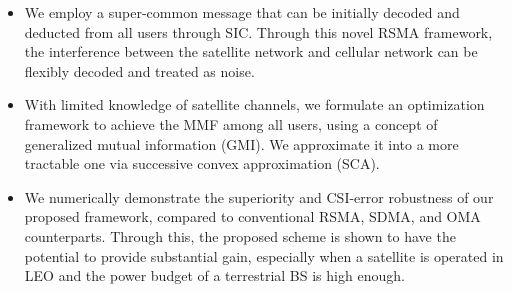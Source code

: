 \documentclass[draftclsnofoot, onecolumn, comsoc, 12pt]{IEEEtran}
\begin{document}
\begin{itemize}
\item We employ a super-common message that can be initially decoded and deducted from all users through SIC.
Through this novel RSMA framework, the interference between the satellite network and cellular network can be flexibly decoded and  treated as noise.%
\item {With limited knowledge of satellite channels, we formulate an optimization framework to achieve the MMF among all users, using a concept of generalized mutual information (GMI). 
We approximate it into a more tractable one via successive convex approximation (SCA).}
\item We numerically demonstrate the superiority and CSI-error robustness of our proposed framework, compared to conventional  RSMA, SDMA, and OMA counterparts. 
{Through this, the proposed scheme is shown to have the potential to provide substantial gain, especially when a satellite is operated in LEO and the power budget of a terrestrial BS is high enough.}
\end{itemize}


\end{document}
